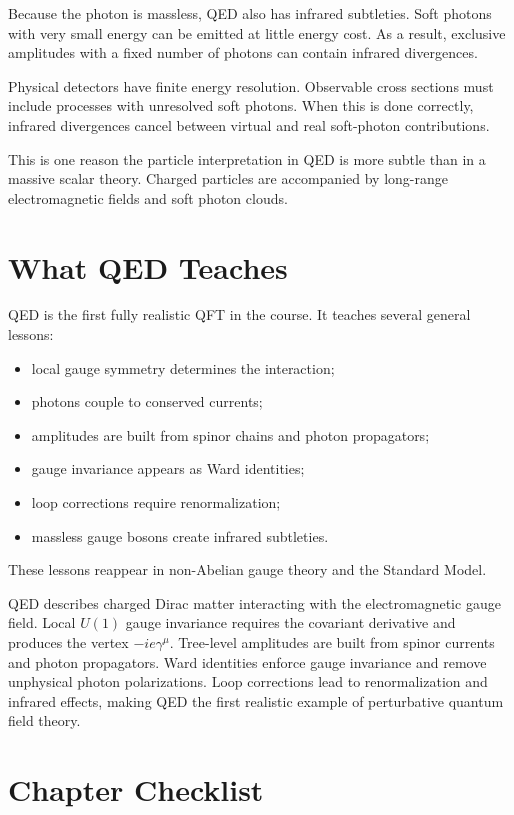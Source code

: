 Because the photon is massless, QED also has infrared subtleties. Soft photons
with very small energy can be emitted at little energy cost. As a result,
exclusive amplitudes with a fixed number of photons can contain infrared
divergences.

Physical detectors have finite energy resolution. Observable cross sections must
include processes with unresolved soft photons. When this is done correctly,
infrared divergences cancel between virtual and real soft-photon contributions.

This is one reason the particle interpretation in QED is more subtle than in a
massive scalar theory. Charged particles are accompanied by long-range
electromagnetic fields and soft photon clouds.

\section{What QED Teaches}

QED is the first fully realistic QFT in the course. It teaches several general
lessons:
\begin{itemize}
    \item local gauge symmetry determines the interaction;
    \item photons couple to conserved currents;
    \item amplitudes are built from spinor chains and photon propagators;
    \item gauge invariance appears as Ward identities;
    \item loop corrections require renormalization;
    \item massless gauge bosons create infrared subtleties.
\end{itemize}
These lessons reappear in non-Abelian gauge theory and the Standard Model.

\begin{summarybox}
QED describes charged Dirac matter interacting with the electromagnetic gauge
field. Local \(U(1)\) gauge invariance requires the covariant derivative and
produces the vertex \(-ie\gamma^\mu\). Tree-level amplitudes are built from
spinor currents and photon propagators. Ward identities enforce gauge invariance
and remove unphysical photon polarizations. Loop corrections lead to
renormalization and infrared effects, making QED the first realistic example of
perturbative quantum field theory.
\end{summarybox}

\section{Chapter Checklist}

